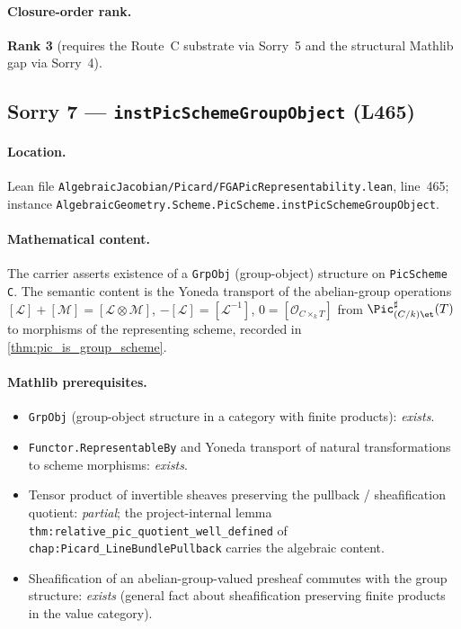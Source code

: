 \paragraph{Closure-order rank.} \textbf{Rank 3} (requires the
Route~C substrate via Sorry~5 and the structural Mathlib gap via
Sorry~4).

\subsection{Sorry 7 --- \texttt{instPicSchemeGroupObject} (L465)}
\label{subsec:sorry_pic_scheme_group_object}

\paragraph{Location.} Lean file
\texttt{AlgebraicJacobian/Picard/FGAPicRepresentability.lean},
line~465; instance
\texttt{AlgebraicGeometry.Scheme.PicScheme.instPicSchemeGroupObject}.

\paragraph{Mathematical content.} The carrier asserts existence of a
\texttt{GrpObj} (group-object) structure on \texttt{PicScheme C}.
The semantic content is the Yoneda transport of the abelian-group
operations $[\mathcal{L}] + [\mathcal{M}] = [\mathcal{L} \otimes \mathcal{M}]$,
$-[\mathcal{L}] = [\mathcal{L}^{-1}]$,
$0 = [\mathcal{O}_{C \times_k T}]$ from
$\Pic^\sharp_{(C/k)\et}(T)$ to morphisms of the representing scheme,
recorded in \cref{thm:pic_is_group_scheme}.

\paragraph{Mathlib prerequisites.}
\begin{itemize}
  \item \texttt{GrpObj} (group-object structure in a category with
    finite products): \emph{exists}.
  \item \texttt{Functor.RepresentableBy} and Yoneda transport of
    natural transformations to scheme morphisms: \emph{exists}.
  \item Tensor product of invertible sheaves preserving the
    pullback / sheafification quotient: \emph{partial}; the
    project-internal lemma
    \texttt{thm:relative\_pic\_quotient\_well\_defined} of
    \texttt{chap:Picard\_LineBundlePullback} carries the algebraic
    content.
  \item Sheafification of an abelian-group-valued presheaf commutes
    with the group structure: \emph{exists} (general fact about
    sheafification preserving finite products in the value category).
\end{itemize}

